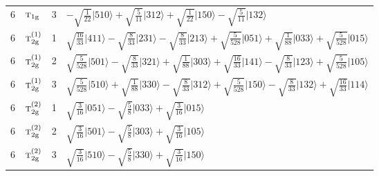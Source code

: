 \documentclass[11pt]{article}
\newcommand{\irr}[1]{\text{\normalfont\scshape #1}}
\newcommand{\ptag}[1]{\mathrm{#1}}
\newcommand{\occ}[1]{\lvert #1\rangle}
\begin{document}
\begin{longtable}{c l c p{}}
6 & $\irr{t}_{1\ptag{g}}$ & 3 & $-\sqrt{\tfrac{1}{22}}\occ{510}+\sqrt{\tfrac{5}{11}}\occ{312}+\sqrt{\tfrac{1}{22}}\occ{150}-\sqrt{\tfrac{5}{11}}\occ{132}$\\
6 & $\irr{t}_{2\ptag{g}}^{(1)}$ & 1 & $\sqrt{\tfrac{16}{33}}\occ{411}-\sqrt{\tfrac{8}{33}}\occ{231}-\sqrt{\tfrac{8}{33}}\occ{213}+\sqrt{\tfrac{5}{528}}\occ{051}+\sqrt{\tfrac{1}{88}}\occ{033}+\sqrt{\tfrac{5}{528}}\occ{015}$\\
6 & $\irr{t}_{2\ptag{g}}^{(1)}$ & 2 & $\sqrt{\tfrac{5}{528}}\occ{501}-\sqrt{\tfrac{8}{33}}\occ{321}+\sqrt{\tfrac{1}{88}}\occ{303}+\sqrt{\tfrac{16}{33}}\occ{141}-\sqrt{\tfrac{8}{33}}\occ{123}+\sqrt{\tfrac{5}{528}}\occ{105}$\\
6 & $\irr{t}_{2\ptag{g}}^{(1)}$ & 3 & $\sqrt{\tfrac{5}{528}}\occ{510}+\sqrt{\tfrac{1}{88}}\occ{330}-\sqrt{\tfrac{8}{33}}\occ{312}+\sqrt{\tfrac{5}{528}}\occ{150}-\sqrt{\tfrac{8}{33}}\occ{132}+\sqrt{\tfrac{16}{33}}\occ{114}$\\
6 & $\irr{t}_{2\ptag{g}}^{(2)}$ & 1 & $\sqrt{\tfrac{3}{16}}\occ{051}-\sqrt{\tfrac{5}{8}}\occ{033}+\sqrt{\tfrac{3}{16}}\occ{015}$\\
6 & $\irr{t}_{2\ptag{g}}^{(2)}$ & 2 & $\sqrt{\tfrac{3}{16}}\occ{501}-\sqrt{\tfrac{5}{8}}\occ{303}+\sqrt{\tfrac{3}{16}}\occ{105}$\\
6 & $\irr{t}_{2\ptag{g}}^{(2)}$ & 3 & $\sqrt{\tfrac{3}{16}}\occ{510}-\sqrt{\tfrac{5}{8}}\occ{330}+\sqrt{\tfrac{3}{16}}\occ{150}$\\
\hline
\end{longtable}
\end{document}

